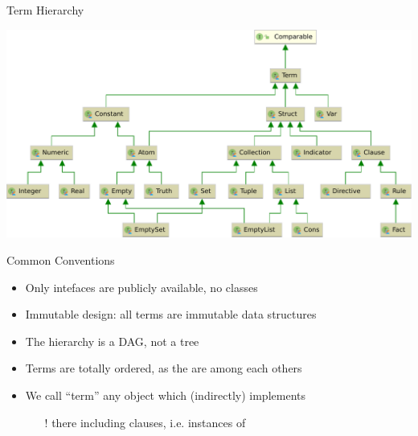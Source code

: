 \documentclass[handout]{beamer}
\begin{document}
\begin{frame}[allowframebreaks]{Term Hierarchy}
    \begin{center}
        \includegraphics[width=\linewidth]{img/TermHierachy.pdf}
    \end{center}

    \begin{block}{Common Conventions}
        \begin{itemize}
            \item Only intefaces are publicly available, no classes
            \item Immutable design: all terms are immutable data structures
            \item The hierarchy is a DAG, not a tree
            \item Terms are totally ordered, as the are  among each others
            \item We call ``term'' any object which (indirectly) implements 
            \begin{itemize}
                \item[!] there including clauses, i.e. instances of 
            \end{itemize}
        \end{itemize}
    \end{block}
\end{frame}
\end{document}
